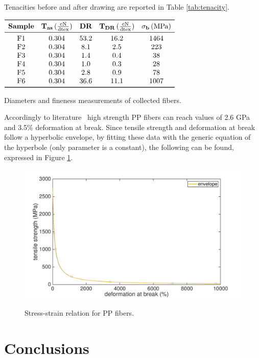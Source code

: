 \documentclass[a4paper, 11pt]{article}
\begin{document}
Tenacities before and after drawing are reported in Table \ref{tab:tenacity}.
\begin{table}[htp]
\centering
$
\begin{array}{ccccc}
\toprule
\textbf{Sample} & \mathbf{T_{as}} \, (\frac{\text{cN}}{\text{dtex}}) & \textbf{DR} & \mathbf{T_{DR}}\, (\frac{\text{cN}}{\text{dtex}}) & \mathbf{\sigma_b} \, (\text{MPa})\\
\midrule
\text{F1} & 0.304 & 53.2 & 16.2 & 1464\\
\text{F2} & 0.304 & 8.1 & 2.5 & 223\\ 
\text{F3} & 0.304 & 1.4 & 0.4 & 38\\
\text{F4} & 0.304 & 1.0 & 0.3 & 28\\
\text{F5} & 0.304 & 2.8 & 0.9 & 78\\
\text{F6} & 0.304 & 36.6 & 11.1 & 1007\\
\bottomrule
\end{array}
$
\caption{Diameters and fineness measurements of collected fibers.}
\label{tab:titer}
\end{table}

Accordingly to literature~\cite{encyclopedia} high strength PP fibers can reach values of 2.6 GPa and 3.5\% deformation at break. Since tensile strength and deformation at break follow a hyperbolic envelope, by fitting these data with the generic equation of the hyperbole (only parameter is a constant), the following can be found, expressed in Figure \ref{fig:hyperbole}.
\begin{figure}[htp]
	\centering
	\includegraphics[scale=0.15]
	{hyperbole.png}
	\label{fig:hyperbole}
	\caption{Stress-strain relation for PP fibers.}
\end{figure}

\section{Conclusions}
\end{document}
